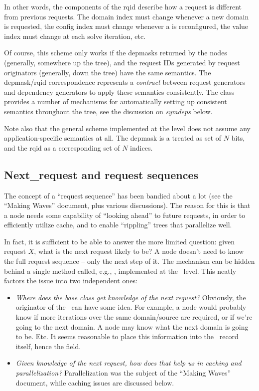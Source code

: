   In other words, the components of the rqid describe how a request is
  different from previous requests. The domain index must change whenever a new
  domain is requested, the config index must change whenever a  is
  reconfigured, the value index must change at each solve iteration, etc.

  Of course, this scheme only works if the depmasks returned by the nodes
  (generally, somewhere up the tree), and the request IDs generated by request
  originators (generally, down the tree) have the same semantics. The
  depmask/rqid correspondence represents a {\em contract} between request
  generators and dependency generators to apply these semantics consistently.
  The  class provides a number of mechanisms for automatically setting
  up consistent semantics throughout the tree, see the discussion on {\em
  symdeps} below.

  Note also that the general scheme implemented at the  level does not
  assume any application-specific semantics at all. The depmask is a treated as
  set of $N$ bits, and the rqid as a corresponding set of $N$ indices.

\subsection{Next\_request and request sequences}

  The concept of a ``request sequence'' has been bandied about a lot (see the
  ``Making Waves'' document, plus various discussions). The reason for this is
  that a node needs some capability of ``looking ahead'' to future requests, in
  order to efficiently utilize cache, and to enable ``rippling'' trees that
  parallelize well.

  In fact, it is sufficient to be able to answer the more limited question:
  given request $X$, what is the next request likely to be? A node doesn't 
  need to know the full request sequence -- only the next step of it. The
  mechanism can be hidden behind a single method called, e.g.,
  , implemented at the \Node\ level. This neatly
  factors the issue into two independent ones:

  \begin{itemize}
  
  \item {\em Where does the base  class get knowledge of the next
    request?} Obviously, the originator of the \Request\ can have some idea. 
    For example, a  node would probably know if more iterations over
    the same domain/source are required, or if we're going to the next domain.
    A  node may know what the next domain is going to be. Etc. It
    seems reasonable to place this information into the \Request\ record
    itself, hence the  field.

  \item {\em Given knowledge of the next request, how does that help us in
    caching and parallelization?} Parallelization was the subject of the
    ``Making Waves'' document, while caching issues are discussed below.

  \end{itemize}
  
